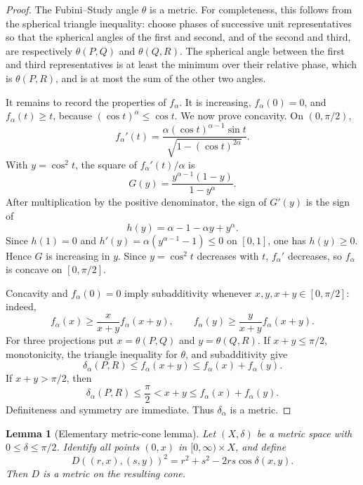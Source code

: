 \documentclass[11pt]{article}
\newtheorem{lemma}{Lemma}
\begin{document}
\begin{proof}
The Fubini--Study angle $\theta$ is a metric.  For completeness, this follows
from the spherical triangle inequality: choose phases of successive unit
representatives so that the spherical angles of the first and second, and of
the second and third, are respectively $\theta(P,Q)$ and $\theta(Q,R)$.
The spherical angle between the first and third representatives is at least
the minimum over their relative phase, which is $\theta(P,R)$, and is at most
the sum of the other two angles.

It remains to record the properties of $f_\alpha$.  It is increasing,
$f_\alpha(0)=0$, and $f_\alpha(t)\geq t$, because
$(\cos t)^\alpha\leq\cos t$.  We now prove concavity.  On $(0,\pi/2)$,
\[
 f_\alpha'(t)
  =\frac{\alpha(\cos t)^{\alpha-1}\sin t}
          {\sqrt{1-(\cos t)^{2\alpha}}}.
\]
With $y=\cos^2t$, the square of $f_\alpha'(t)/\alpha$ is
\[
 G(y)=\frac{y^{\alpha-1}(1-y)}{1-y^\alpha}.
\]
After multiplication by the positive denominator, the sign of $G'(y)$ is the
sign of
\[
 h(y)=\alpha-1-\alpha y+y^\alpha.
\]
Since $h(1)=0$ and
$h'(y)=\alpha(y^{\alpha-1}-1)\leq0$ on $[0,1]$, one has $h(y)\geq0$.
Hence $G$ is increasing in $y$.  Since $y=\cos^2t$ decreases with $t$,
$f_\alpha'$ decreases, so $f_\alpha$ is concave on $[0,\pi/2]$.

Concavity and $f_\alpha(0)=0$ imply subadditivity whenever
$x,y,x+y\in[0,\pi/2]$: indeed,
\[
 f_\alpha(x)\geq\frac{x}{x+y}f_\alpha(x+y),\qquad
 f_\alpha(y)\geq\frac{y}{x+y}f_\alpha(x+y).
\]
For three projections put $x=\theta(P,Q)$ and $y=\theta(Q,R)$.  If
$x+y\leq\pi/2$, monotonicity, the triangle inequality for $\theta$, and
subadditivity give
\[
 \delta_\alpha(P,R)\leq f_\alpha(x+y)
 \leq f_\alpha(x)+f_\alpha(y).
\]
If $x+y>\pi/2$, then
\[
 \delta_\alpha(P,R)\leq\frac\pi2<x+y
 \leq f_\alpha(x)+f_\alpha(y).
\]
Definiteness and symmetry are immediate.  Thus $\delta_\alpha$ is a metric.
\end{proof}

\begin{lemma}[Elementary metric-cone lemma]\label{lem:cone}
Let $(X,\delta)$ be a metric space with $0\leq\delta\leq\pi/2$.  Identify all
points $(0,x)$ in $[0,\infty)\times X$, and define
\[
 D((r,x),(s,y))^2=r^2+s^2-2rs\cos\delta(x,y).
\]
Then $D$ is a metric on the resulting cone.
\end{lemma}
\end{document}

